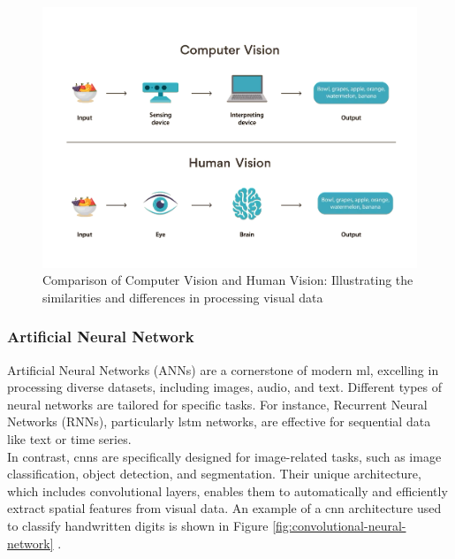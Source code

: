 \begin{figure}[h!]
    \centering
    \includegraphics[width=0.75\linewidth]{figures/theory/machine-learning/computer-vision.png}
    \caption[Computer Vision vs. Human Vision]{Comparison of Computer Vision and Human Vision: Illustrating the similarities and differences in processing visual data \cite{turing:computer-vision}} 
    \label{fig:computer-vision}
\end{figure}

\subsubsection*{Artificial Neural Network}
\label{subsubsec:artificial-neural-network}

Artificial Neural Networks (ANNs) are a cornerstone of modern \gls{ml}, excelling in processing diverse datasets, including images, audio, and text. Different types of neural networks are tailored for specific tasks. For instance, Recurrent Neural Networks (RNNs), particularly \gls{lstm} networks, are effective for sequential data like text or time series. \\

In contrast, \glspl{cnn} are specifically designed for image-related tasks, such as image classification, object detection, and segmentation. Their unique architecture, which includes convolutional layers, enables them to automatically and efficiently extract spatial features from visual data. An example of a \gls{cnn} architecture used to classify handwritten digits is shown in Figure \ref{fig:convolutional-neural-network} \cite{geeksforgeeks:cnn}. \\

